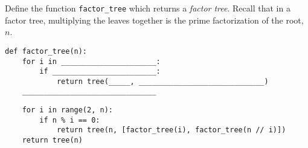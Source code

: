 \begin{blocksection}
\question Define the function \lstinline$factor_tree$ which returns a \emph{factor tree}. Recall that in a factor tree, multiplying the leaves together is the prime factorization of the root, $n$. \\

\begin{lstlisting}
def factor_tree(n):
    for i in ______________________:
        if ________________________:
            return tree(_____, _____________________________)
    _______________________________
\end{lstlisting}

\begin{solution}[0.5in]
\begin{lstlisting}
    for i in range(2, n):
        if n % i == 0:
            return tree(n, [factor_tree(i), factor_tree(n // i)])
    return tree(n)
\end{lstlisting}
\end{solution}
\end{blocksection}
